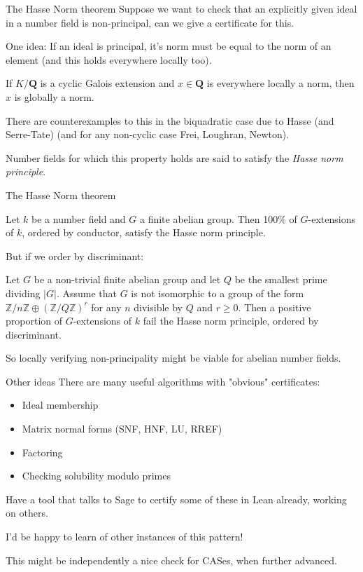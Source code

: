 \documentclass{beamer}
\theoremstyle{plain}
\begin{document}
\begin{frame}{The Hasse Norm theorem}
    Suppose we want to check that an explicitly given ideal in a number field is non-principal, can we give a certificate for this.

    One idea: If an ideal is principal, it's norm must be equal to the norm of an element (and this holds everywhere locally too).

    \begin{theorem}
        If $K/\mathbf Q$ is a cyclic Galois extension and $x \in \mathbf Q$ is everywhere locally a norm, then $x$ is globally a norm.
    \end{theorem}
\pause
    There are counterexamples to this in the biquadratic case due to Hasse (and Serre-Tate) (and for any non-cyclic case Frei, Loughran, Newton).

    Number fields for which this property holds are said to satisfy the \emph{Hasse norm principle}.
\end{frame}

\begin{frame}{The Hasse Norm theorem}
    \begin{theorem}
        Let $k$ be a number field and $G$ a finite abelian group. Then 100\% of $G$-extensions of $k$, ordered by conductor, satisfy the Hasse norm principle.
    \end{theorem}\pause
    But if we order by discriminant:

    \begin{theorem} Let $G$ be a non-trivial finite abelian group and let $Q$ be the smallest prime dividing $|G|$. Assume that $G$ is not isomorphic to a group of the form $\mathbb{Z} / n \mathbb{Z} \oplus(\mathbb{Z} / Q \mathbb{Z})^{r}$ for any $n$ divisible by $Q$ and $r \geq 0$. Then a positive proportion of $G$-extensions of $k$ fail the Hasse norm principle, ordered by discriminant.
    \end{theorem}
    So locally verifying non-principality might be viable for abelian number fields.
\end{frame}

\begin{frame}{Other ideas}
    There are many useful algorithms with "obvious" certificates:
    \begin{itemize}
        \item Ideal membership
        \item Matrix normal forms (SNF, HNF, LU, RREF)
        \item Factoring
        \item Checking solubility modulo primes
    \end{itemize}
\pause
    Have a tool that talks to Sage to certify some of these in Lean already, working on others.

    I'd be happy to learn of other instances of this pattern!

    This might be independently a nice check for CASes, when further advanced.
\end{frame}
\end{document}
